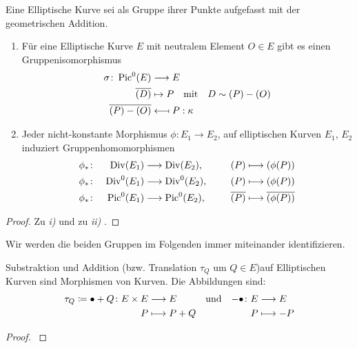 \begin{Satz}\label{gruppenaequivalenz}
  Eine Elliptische Kurve sei als Gruppe ihrer Punkte aufgefasst
  mit der geometrischen Addition.
  \begin{enumerate}[label=\roman*)]
  \item 
    Für eine Elliptische Kurve $E$ mit neutralem Element $O\in E$ gibt
    es einen Gruppenisomorphismus
    \begin{align*}
      \sigma\colon \operatorname{Pic}^0(E) &\longrightarrow E\\
      \overline{(D)} &\mapsto P
                       \quad\text{mit}\quad D\sim (P)-(O)\\
      \overline{(P)-(O)} &\longmapsfrom P : \kappa
    \end{align*}

  \item
    Jeder nicht-konstante Morphismus $\phi\colon E_1\to E_2$, 
    auf elliptischen Kurven $E_1$, $E_2$ induziert Gruppenhomomorphismen
    \begin{alignat*}{3}
      &\phi_*\colon& \operatorname{Div}(E_1) 
      &\longrightarrow \operatorname{Div}(E_2),
      \qquad
      &(P) &\longmapsto (\phi(P))\\
      &\phi_*\colon& \operatorname{Div}^0(E_1) 
      &\longrightarrow \operatorname{Div}^0(E_2),
      &(P) &\longmapsto (\phi(P))\\
      &\phi_*\colon& \operatorname{Pic}^0(E_1) 
      &\longrightarrow \operatorname{Pic}^0(E_2),
      &\overline{(P)} &\longmapsto \overline{(\phi(P))}\\
    \end{alignat*}
  \end{enumerate}
  \begin{proof}
    Zu \emph{i)} \cite[siehe][Proposition III.3.4]{silverman} und
    zu \emph{ii)} \cite[siehe][Remark II.3.7]{silverman}.
    \end{proof}
  \end{Satz}
  Wir werden die beiden Gruppen im Folgenden immer miteinander
  identifizieren.


  \begin{Satz}\label{additionmorphismus}
    Substraktion und Addition (bzw. Translation $\tau_Q$ um $Q\in E$)auf
    Elliptischen Kurven sind Morphismen von Kurven. Die Abbildungen sind:
    \begin{align*}
      \tau_Q\coloneqq\bullet+Q\colon E\times E&\longrightarrow E  
      &&\text{und}  
      &-\bullet\colon E&\longrightarrow E \\
      P&\longmapsto P+Q             
      &&&P&\longmapsto -P
    \end{align*}
    \begin{proof}
      \cite[siehe][Theorem III.3.6]{silverman}
    \end{proof}
  \end{Satz}


